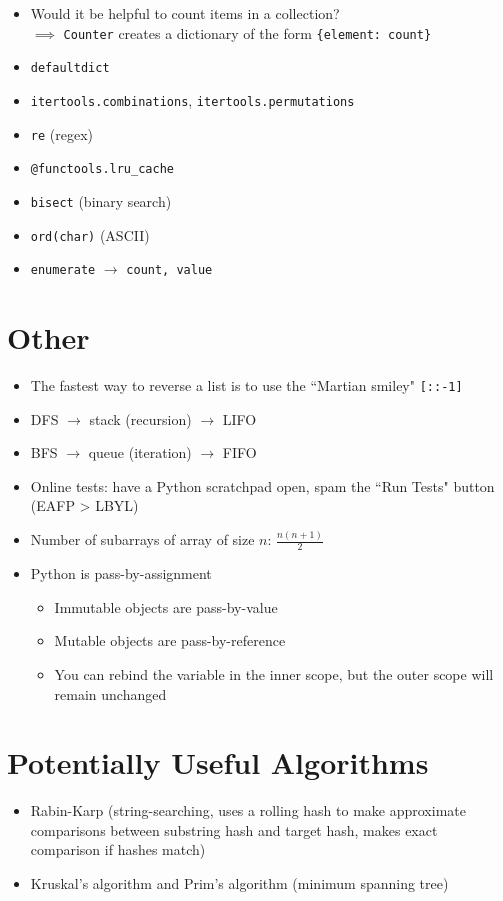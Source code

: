\documentclass[12pt]{article}
\begin{document}
\begin{itemize}
  \item Would it be helpful to count items in a collection? \\
        \-\hspace{1em} $\implies$ \texttt{Counter} creates a dictionary of the form \texttt{\{element: count\}}
  \item \texttt{defaultdict}
  \item \texttt{itertools.combinations}, \texttt{itertools.permutations}
  \item \texttt{re} (regex)
  \item \texttt{@functools.lru\_cache}
  \item \texttt{bisect} (binary search)
  \item \texttt{ord(char)} (ASCII)
  \item \texttt{enumerate} $\rightarrow$ \texttt{count, value}
\end{itemize}

\section{Other}

\begin{itemize}
  \item The fastest way to reverse a list is to use the ``Martian smiley" \texttt{[::-1]}
  \item DFS $\rightarrow$ stack (recursion) $\rightarrow$ LIFO
  \item BFS $\rightarrow$ queue (iteration) $\rightarrow$ FIFO
  \item Online tests: have a Python scratchpad open, spam the ``Run Tests" button (EAFP > LBYL)
  \item Number of subarrays of array of size $n$: $\frac{n(n+1)}{2}$
  \item Python is pass-by-assignment
  \begin{itemize}
    \item Immutable objects are pass-by-value
    \item Mutable objects are pass-by-reference
    \item You can rebind the variable in the inner scope, but the outer scope will remain unchanged
  \end{itemize}
\end{itemize}

\section{Potentially Useful Algorithms}

\begin{itemize}
  \item Rabin-Karp (string-searching, uses a rolling hash to make approximate comparisons between substring hash and target hash, makes exact comparison if hashes match)
  \item Kruskal's algorithm and Prim's algorithm (minimum spanning tree)
\end{itemize}
\end{document}
